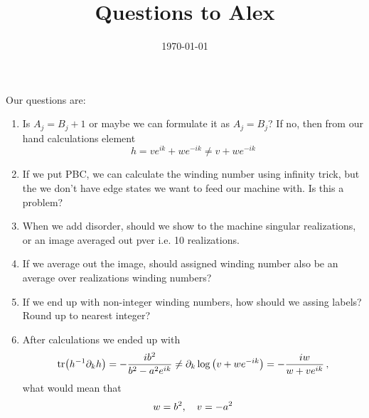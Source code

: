 \documentclass[12pt,a4paper]{article}
\title{Questions to Alex}
\date{\today}
\newcommand{\pd}[1]{\partial_{#1}}
\begin{document}
\maketitle
    Our questions are:
    \begin{enumerate}
        \item
        Is $A_j = B_{j} + 1$ or maybe we can formulate it as $A_j = B_j$? If no, then from our hand calculations element $$h=ve^{ik}+we^{-ik} \neq v + we^{-ik}$$
        \item 
        If we put PBC, we can calculate the winding number using infinity trick, but the we don't have edge states we want to feed our machine with. Is this a problem?
        \item 
        When we add disorder, should we show to the machine singular realizations, or an image averaged out pver i.e. 10 realizations.
        \item
        If we average out the image, should assigned winding number also be an average over realizations winding numbers?
        \item 
        If we end up with non-integer winding numbers, how should we assing labels? Round up to nearest integer?
        \item 
        After calculations we ended up with $$\tr(h^{-1} \pd{k} h) = -\frac{i b^2}{b^2 - a^2 e^{ik}} \neq \pd{k} \log\qty(v + we^{-ik}) = -\frac{i w}{w + ve^{ik}}\, ,$$ what would mean that $$w = b^2 \qc v = -a^2 $$
    \end{enumerate}
\end{document}
